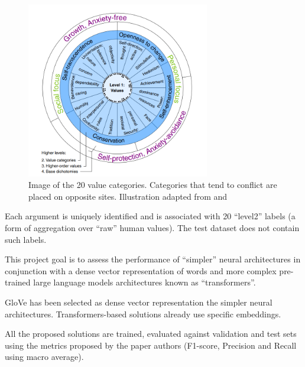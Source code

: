 \documentclass[11pt]{article}
\begin{document}
\begin{figure}[H]
    \centering
    \includegraphics[width=8cm]{figures/schwartz_values.png}
    \caption{Image of the 20 value categories. Categories that tend to conflict are placed on opposite sites. Illustration adapted from \cite{Kiesel2022} and \cite{Schwartz2012}}
    \label{fig:values}
\end{figure}

Each argument is uniquely identified and is associated with 20 ``level2'' labels (a form of aggregation over ``raw'' human values).
The test dataset does not contain such labels.

This project goal is to assess the performance of ``simpler'' neural architectures in conjunction with a dense vector representation of words and more complex pre-trained large language models architectures known as ``transformers''.

GloVe\cite{Pennington2014} has been selected as dense vector representation the simpler neural architectures. Transformers-based solutions already use specific embeddings.

All the proposed solutions are trained, evaluated against validation and test sets using the metrics proposed by the paper authors (F1-score, Precision and Recall using macro average).



\end{document}
